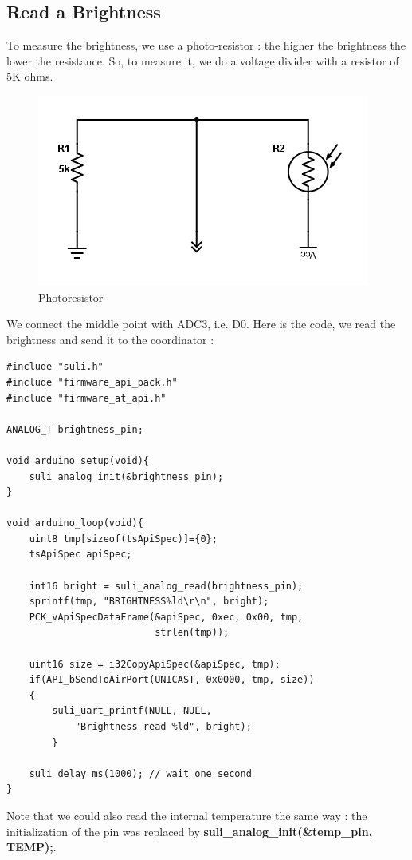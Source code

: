 \subsection{Read a Brightness}

To measure the brightness, we use a photo-resistor : the higher the brightness the lower the resistance. So, to measure it, we do a voltage divider with a resistor of 5K ohms.

\begin{figure}[ht]
\centering
\includegraphics[width=.6\linewidth]{photores}
\caption[Photoresistor]{\label{f:photores}Photoresistor}
\end{figure}

We connect the middle point with ADC3, i.e. D0. Here is the code, we read the brightness and send it to the coordinator :

\begin{lstlisting}[frame=single]
#include "suli.h"
#include "firmware_api_pack.h"
#include "firmware_at_api.h"

ANALOG_T brightness_pin;

void arduino_setup(void){
    suli_analog_init(&brightness_pin);
}

void arduino_loop(void){
    uint8 tmp[sizeof(tsApiSpec)]={0};
    tsApiSpec apiSpec;

    int16 bright = suli_analog_read(brightness_pin);
    sprintf(tmp, "BRIGHTNESS%ld\r\n", bright);
    PCK_vApiSpecDataFrame(&apiSpec, 0xec, 0x00, tmp,
                          strlen(tmp));

    uint16 size = i32CopyApiSpec(&apiSpec, tmp);
    if(API_bSendToAirPort(UNICAST, 0x0000, tmp, size))
    {
        suli_uart_printf(NULL, NULL,
            "Brightness read %ld", bright);
        }

    suli_delay_ms(1000); // wait one second
}
\end{lstlisting}

Note that we could also read the internal temperature the same way : the initialization of the pin was replaced by \textbf{suli\_analog\_init(\&temp\_pin, TEMP);}.

